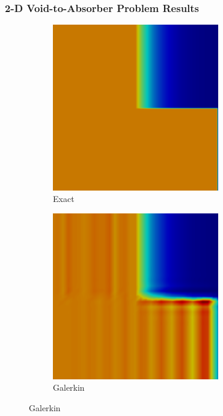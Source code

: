 \documentclass{beamer} \useoutertheme{infolines}
\begin{document}
\begin{frame}
\frametitle{2-D Void-to-Absorber Problem Results}

\begin{figure}[h]
   \centering
   \begin{subfigure}{0.3\textwidth}
      \includegraphics[width=0.8\textwidth]{./figures/exact.png}
      \caption{Exact}
   \end{subfigure}
   \begin{subfigure}{0.3\textwidth}
      \includegraphics[width=0.8\textwidth]{./figures/Gal.png}
      \caption{Galerkin}
   \end{subfigure}

\end{figure}
\end{frame}
\end{document}
